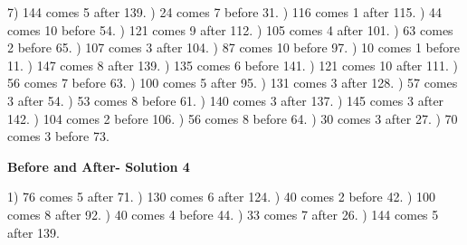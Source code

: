 \documentclass{article}%
\begin{document}
7) 144 comes 5 after 139.%
) 24 comes 7 before 31.%
) 116 comes 1 after 115.%
) 44 comes 10 before 54.%
) 121 comes 9 after 112.%
) 105 comes 4 after 101.%
) 63 comes 2 before 65.%
) 107 comes 3 after 104.%
) 87 comes 10 before 97.%
) 10 comes 1 before 11.%
) 147 comes 8 after 139.%
) 135 comes 6 before 141.%
) 121 comes 10 after 111.%
) 56 comes 7 before 63.%
) 100 comes 5 after 95.%
) 131 comes 3 after 128.%
) 57 comes 3 after 54.%
) 53 comes 8 before 61.%
) 140 comes 3 after 137.%
) 145 comes 3 after 142.%
) 104 comes 2 before 106.%
) 56 comes 8 before 64.%
) 30 comes 3 after 27.%
) 70 comes 3 before 73.%
\newline%
\newpage%
\large%
\begin{center}%
\textbf{Before and After- Solution 4}%
\newline%
\end{center} \normalsize%
1) 76 comes 5 after 71.%
) 130 comes 6 after 124.%
) 40 comes 2 before 42.%
) 100 comes 8 after 92.%
) 40 comes 4 before 44.%
) 33 comes 7 after 26.%
) 144 comes 5 after 139.%
\newline%
\end{document}
